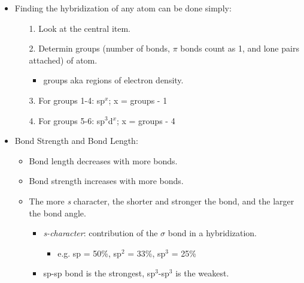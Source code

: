 \documentclass[12pt,a4paper]{article}
\begin{document}
\begin{itemize}
\begin{itemize}
        \end{itemize}
    \item Finding the hybridization of any atom can be done simply: 
        \begin{itemize}
            \item[1.] Look at the central item.
            \item[2.] Determin groups (number of bonds, $\pi$ bonds count as 1, and lone pairs attached) of atom.
                    \begin{itemize}
                        \item groups aka regions of electron density.
                    \end{itemize}
            \item[3.] For groups 1-4: sp\(^{x}\); x = groups - 1  
            \item[4.] For groups 5-6: sp\(^{3}\)d\(^{x}\); x = groups - 4 
        \end{itemize}
    \item Bond Strength and Bond Length:
        \begin{itemize}
            \item Bond length {\color{neg}decreases} with more bonds.
            \item Bond strength {\color{pos}increases} with more bonds.
            \item The more {\color{o-Sun}\textit{s} character}, the {\color{pos}shorter} and {\color{pos}stronger} the bond, and the {\color{pos}larger} the bond angle.
                \begin{itemize}
                    \item \textit{s-character}: contribution of the $\sigma$ bond in a hybridization.
                        \begin{itemize}
                            \item e.g. sp = 50\%, sp\(^{2}\) = 33\%, sp\(^{3}\) = 25\%
                        \end{itemize}
                    \item sp-sp bond is the strongest, sp\(^{3}\)-sp\(^{3}\) is the weakest.
                \end{itemize}
        \end{itemize}
\end{itemize}
\end{document}
